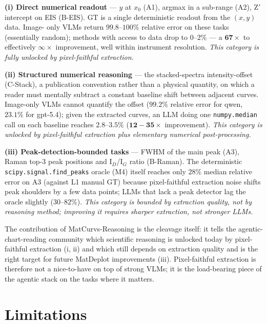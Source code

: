 \documentclass{article}
\begin{document}
\textbf{(i) Direct numerical readout} --- $y$ at $x_{0}$ (A1),
argmax in a sub-range (A2), Z$'$ intercept on EIS (B-EIS).
GT is a single deterministic readout from the $(x,y)$ data. Image-
only VLMs return $99.8\text{--}100\%$ relative error on these tasks
(essentially random); methods with access to data drop to
$0\text{--}2\%$ --- a $\mathbf{67\times}$ to effectively
$\mathbf{\infty\times}$ improvement, well within instrument
resolution. \emph{This category is fully unlocked by pixel-faithful
extraction.}

\textbf{(ii) Structured numerical reasoning} --- the
stacked-spectra intensity-offset (C-Stack), a publication
convention rather than a physical quantity, on which a reader must
mentally subtract a constant baseline shift between adjacent
curves. Image-only VLMs cannot quantify the offset
($99.2\%$ relative error for qwen, $23.1\%$ for gpt-5.4); given the
extracted curves, an LLM doing one \texttt{numpy.median} call on
each baseline reaches $2.8\text{--}3.5\%$
($\mathbf{12{-}35\times}$ improvement). \emph{This category is
unlocked by pixel-faithful extraction plus elementary numerical
post-processing.}

\textbf{(iii) Peak-detection-bounded tasks} --- FWHM of the main
peak (A3), Raman top-3 peak positions and I${}_{D}$/I${}_{G}$ ratio
(B-Raman). The deterministic \texttt{scipy.signal.find\_peaks}
oracle (M4) itself reaches only $28\%$ median relative error on A3
(against L1 manual GT) because pixel-faithful extraction noise
shifts peak shoulders by a few data points; LLMs that lack a peak
detector lag the oracle slightly ($30\text{--}82\%$). \emph{This
category is bounded by extraction quality, not by reasoning method;
improving it requires sharper extraction, not stronger LLMs.}

The contribution of MatCurvs-Reasoning is the cleavage itself:
it tells the agentic-chart-reading community which scientific
reasoning is unlocked today by pixel-faithful extraction (i, ii)
and which still depends on extraction quality and is the right
target for future MatDeplot improvements (iii). Pixel-faithful
extraction is therefore not a nice-to-have on top of strong VLMs;
it is the load-bearing piece of the agentic stack on the tasks
where it matters.

\section{Limitations}
\label{sec:limits}
\end{document}
